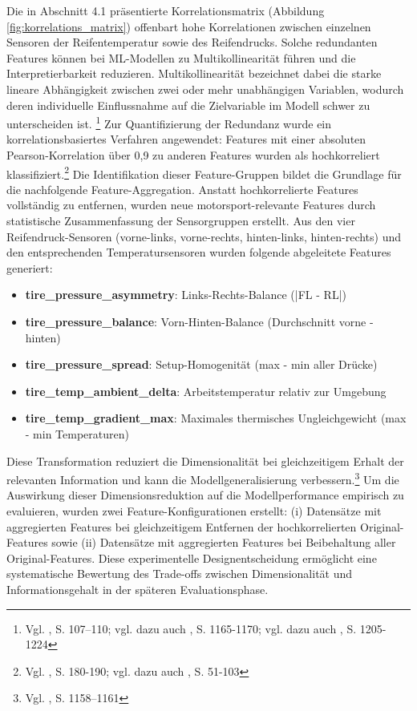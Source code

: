 Die in Abschnitt 4.1 präsentierte Korrelationsmatrix (Abbildung \ref{fig:korrelations_matrix}) offenbart hohe Korrelationen zwischen einzelnen Sensoren der Reifentemperatur sowie des Reifendrucks. Solche redundanten Features können bei \ac{ML}-Modellen zu Multikollinearität führen und die Interpretierbarkeit reduzieren. Multikollinearität bezeichnet dabei die starke lineare Abhängigkeit zwischen zwei oder mehr unabhängigen Variablen, wodurch deren individuelle Einflussnahme auf die Zielvariable im Modell schwer zu unterscheiden ist. \footnote{Vgl. \cite{James2021}, S. 107–110; vgl. dazu auch \cite{Guyon2003}, S. 1165-1170; vgl. dazu auch \cite{YuLiu2004}, S. 1205-1224} 
Zur Quantifizierung der Redundanz wurde ein korrelationsbasiertes Verfahren angewendet: Features mit einer absoluten Pearson-Korrelation über 0,9 zu anderen Features wurden als hochkorreliert klassifiziert.\footnote{Vgl. \cite{Kuhn2019}, S. 180-190; vgl. dazu auch \cite{Hall1999}, S. 51-103} Die Identifikation dieser Feature-Gruppen bildet die Grundlage für die nachfolgende Feature-Aggregation.
Anstatt hochkorrelierte Features vollständig zu entfernen, wurden neue motorsport-relevante Features durch statistische Zusammenfassung der Sensorgruppen erstellt. Aus den vier Reifendruck-Sensoren (vorne-links, vorne-rechts, hinten-links, hinten-rechts) und den entsprechenden Temperatursensoren wurden folgende abgeleitete Features generiert:

\begin{itemize}
  \item \textbf{tire\_pressure\_asymmetry}: Links-Rechts-Balance (|FL - RL|)
  \item \textbf{tire\_pressure\_balance}: Vorn-Hinten-Balance (Durchschnitt vorne - hinten)
  \item \textbf{tire\_pressure\_spread}: Setup-Homogenität (max - min aller Drücke)
  \item \textbf{tire\_temp\_ambient\_delta}: Arbeitstemperatur relativ zur Umgebung
  \item \textbf{tire\_temp\_gradient\_max}: Maximales thermisches Ungleichgewicht (max - min Temperaturen)
\end{itemize} Diese Transformation reduziert die Dimensionalität bei gleichzeitigem Erhalt der relevanten Information und kann die Modellgeneralisierung verbessern.\footnote{Vgl. \cite{Guyon2003}, S. 1158–1161}
Um die Auswirkung dieser Dimensionsreduktion auf die Modellperformance empirisch zu evaluieren, wurden zwei Feature-Konfigurationen erstellt: (i) Datensätze mit aggregierten Features bei gleichzeitigem Entfernen der hochkorrelierten Original-Features sowie (ii) Datensätze mit aggregierten Features bei Beibehaltung aller Original-Features. Diese experimentelle Designentscheidung ermöglicht eine systematische Bewertung des Trade-offs zwischen Dimensionalität und Informationsgehalt in der späteren Evaluationsphase.

